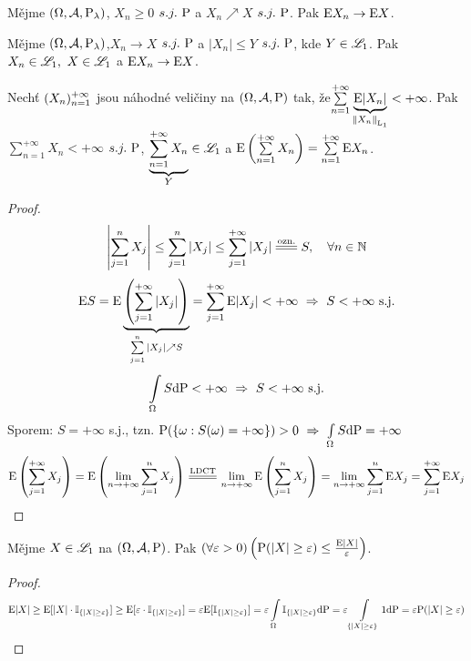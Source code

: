 \begin{theorem}
	Mějme $(\Omega,\mathcal{A},\mathrm{P}_\lambda)$, $X_n\geq 0$ $s.j.~\mathrm{P}$ a $X_n \nearrow X$ $s.j.~\mathrm{P}$. Pak $\mathrm{E} X_n \to \mathrm{E} X$.
\end{theorem}
\begin{theorem}
	Mějme $(\Omega,\mathcal{A},\mathrm{P}_\lambda)$,\newline $X_n\to X$ $s.j.~\mathrm{P}$ a $|X_n|\leq Y$ $s.j.~\mathrm{P}$, kde $Y\in\mathscr{L}_1$. Pak $X_n\in\mathscr{L}_1,~X\in\mathscr{L}_1$ a $\mathrm{E} X_n\to \mathrm{E} X$.
\end{theorem}
\begin{theorem}
		Nechť $(X_n)_{n=1}^{+\infty}$ jsou náhodné veličiny na $(\Omega,\mathcal{A},\mathrm{P})$ tak, že\newline $\sum\limits_{n=1}^{+\infty} \underbrace{\mathrm{E} |X_n|}_{\left\|X_n\right\|_{\mathrm{L}_1}}<+\infty$. Pak $\sum\limits_{n=1}^{+\infty} X_n<+\infty$ $s.j.~\mathrm{P}$, $\underbrace{\sum\limits_{n=1}^{+\infty} X_n}_Y\in\mathscr{L}_1$ a $\mathrm{E} \left( \sum\limits_{n=1}^{+\infty} X_n \right)=\sum\limits_{n=1}^{+\infty} \mathrm{E} X_n$.
		\begin{proof}
			$$ \left| \sum\limits_{j=1}^n X_j \right|\leq \sum\limits_{j=1}^n |X_j|\leq \sum\limits_{j=1}^{+\infty} |X_j|\equal{\text{ozn.}}S,~~~\forall n\in\N $$
			$$ \mathrm{E} S=\mathrm{E} \underbrace{\left( \sum\limits_{j=1}^{+\infty} |X_j| \right)}_{\sum\limits_{j=1}^{n}|X_j|\nearrow S}=\sum\limits_{j=1}^{+\infty} \mathrm{E} |X_j|<+\infty~\Rightarrow~ S<+\infty \text{ s.j.} $$
			$$\int\limits_{\Omega}S\mathrm{d} \mathrm{P}<+\infty~\Rightarrow~ S<+\infty \text{ s.j.} $$
			Sporem: $S=+\infty$ s.j., tzn. $\mathrm{P}(\{ \omega:S(\omega)=+\infty \})>0 ~\Rightarrow~ \int\limits_{\Omega}S\mathrm{d} \mathrm{P}=+\infty$
			$$ \E \left( \sum\limits_{j=1}^{+\infty} X_j \right)=\E \left( \lim\limits_{ n\to +\infty}\sum\limits_{j=1}^n X_j \right)\equal{\text{LDCT}}\lim\limits_{ n\to +\infty} \E \left( \sum\limits_{j=1}^n X_j \right)=\lim\limits_{ n\to +\infty}  \sum\limits_{j=1}^n \E X_j=\sum\limits_{j=1}^{+\infty} \E X_j $$
		\end{proof}
	\end{theorem}
\begin{theorem}
	Mějme $X\in\mathscr{L}_1$ na $(\Omega,\mathcal{A},\mathrm{P})$. Pak $(\forall\varepsilon>0)\left(\mathrm{P}(|X|\geq\varepsilon)\leq \frac{\mathrm{E} |X|}{\varepsilon}\right)$.
	\begin{proof}
	$$ \mathrm{E} |X|\geq \mathrm{E} [|X|\cdot \mathbb{I}_{\{ |X|\geq\varepsilon \}}]\geq \mathrm{E} [\varepsilon\cdot \mathbb{I}_{\{|X|\geq\varepsilon\}}]=\varepsilon \mathrm{E} [\mathbb{I}_{\{|X|\geq\varepsilon\}}]=\varepsilon\int\limits_{\Omega}\mathbb{I}_{\{|X|\geq\varepsilon\}}\mathrm{d} \mathrm{P}=\varepsilon\int\limits_{\{|X|\geq\varepsilon\}}1\mathrm{d} \mathrm{P}=\varepsilon \mathrm{P}(|X|\geq\varepsilon) $$
	\end{proof}
\end{theorem}
